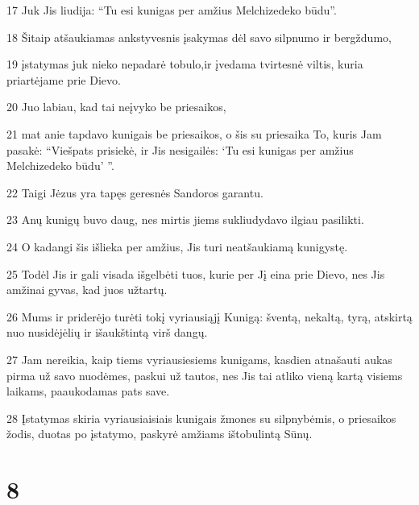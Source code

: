 \par 17 Juk Jis liudija: “Tu esi kunigas per amžius Melchizedeko būdu”. 
\par 18 Šitaip atšaukiamas ankstyvesnis įsakymas dėl savo silpnumo ir bergždumo,­ 
\par 19 įstatymas juk nieko nepadarė tobulo,­ir įvedama tvirtesnė viltis, kuria priartėjame prie Dievo. 
\par 20 Juo labiau, kad tai neįvyko be priesaikos, 
\par 21 mat anie tapdavo kunigais be priesaikos, o šis su priesaika To, kuris Jam pasakė: “Viešpats prisiekė, ir Jis nesigailės: ‘Tu esi kunigas per amžius Melchizedeko būdu’ ”. 
\par 22 Taigi Jėzus yra tapęs geresnės Sandoros garantu. 
\par 23 Anų kunigų buvo daug, nes mirtis jiems sukliudydavo ilgiau pasilikti. 
\par 24 O kadangi šis išlieka per amžius, Jis turi neatšaukiamą kunigystę. 
\par 25 Todėl Jis ir gali visada išgelbėti tuos, kurie per Jį eina prie Dievo, nes Jis amžinai gyvas, kad juos užtartų. 
\par 26 Mums ir priderėjo turėti tokį vyriausiąjį Kunigą: šventą, nekaltą, tyrą, atskirtą nuo nusidėjėlių ir išaukštintą virš dangų. 
\par 27 Jam nereikia, kaip tiems vyriausiesiems kunigams, kasdien atnašauti aukas pirma už savo nuodėmes, paskui už tautos, nes Jis tai atliko vieną kartą visiems laikams, paaukodamas pats save. 
\par 28 Įstatymas skiria vyriausiaisiais kunigais žmones su silpnybėmis, o priesaikos žodis, duotas po įstatymo, paskyrė amžiams ištobulintą Sūnų.


\chapter{8}


